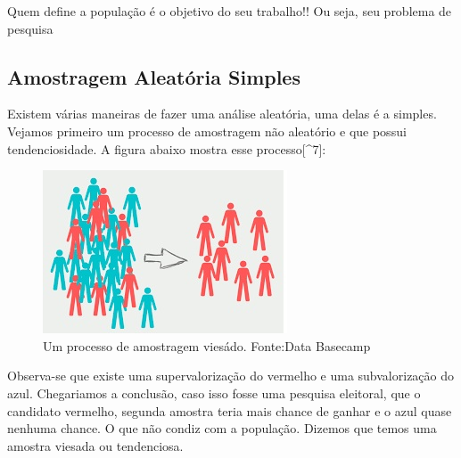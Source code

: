 \documentclass[
  letterpaper,
  DIV=11,
  numbers=noendperiod]{scrreprt}
\begin{document}
\begin{tcolorbox}[enhanced jigsaw, titlerule=0mm, colback=white, coltitle=black, opacityback=0, breakable, colbacktitle=quarto-callout-tip-color!10!white, toprule=.15mm, colframe=quarto-callout-tip-color-frame, toptitle=1mm, bottomtitle=1mm, opacitybacktitle=0.6, left=2mm, arc=.35mm, rightrule=.15mm, bottomrule=.15mm, leftrule=.75mm, title=\textcolor{quarto-callout-tip-color}{\faLightbulb}\hspace{0.5em}{População}]

Quem define a população é o objetivo do seu trabalho!! Ou seja, seu
problema de pesquisa

\end{tcolorbox}

\subsection{Amostragem Aleatória
Simples}\label{amostragem-aleatuxf3ria-simples}

Existem várias maneiras de fazer uma análise aleatória, uma delas é a
simples. Vejamos primeiro um processo de amostragem não aleatório e que
possui tendenciosidade. A figura abaixo mostra esse processo{[}\^{}7{]}:

\begin{figure}[H]

{\centering \includegraphics[width=0.5\linewidth,height=\textheight,keepaspectratio]{figuras/bias.jpg}

}

\caption{Um processo de amostragem viesádo. Fonte:Data Basecamp}

\end{figure}%

Observa-se que existe uma supervalorização do vermelho e uma
subvalorização do azul. Chegariamos a conclusão, caso isso fosse uma
pesquisa eleitoral, que o candidato vermelho, segunda amostra teria mais
chance de ganhar e o azul quase nenhuma chance. O que não condiz com a
população. Dizemos que temos uma amostra viesada ou tendenciosa.
\end{document}

